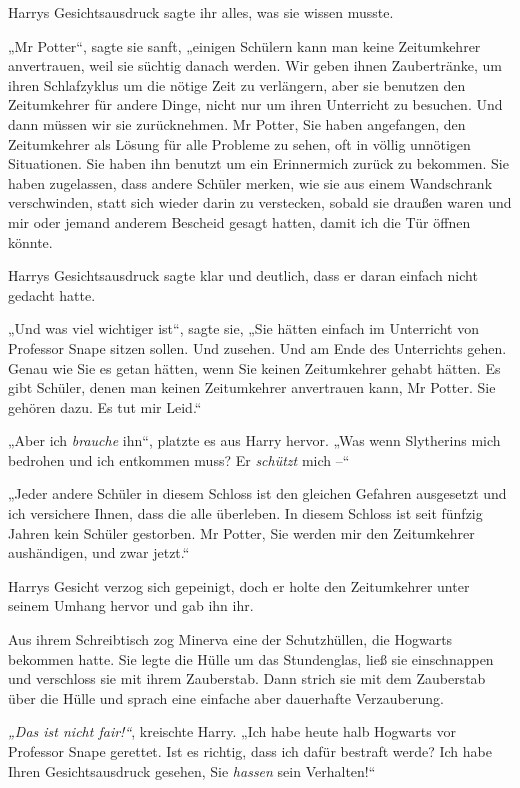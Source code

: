 {Harrys Gesichtsausdruck sagte ihr alles, was sie wissen musste.

„Mr Potter“, sagte sie sanft, „einigen Schülern kann man keine Zeitumkehrer anvertrauen, weil sie süchtig danach werden. Wir geben ihnen Zaubertränke, um ihren Schlafzyklus um die nötige Zeit zu verlängern, aber sie benutzen den Zeitumkehrer für andere Dinge, nicht nur um ihren Unterricht zu besuchen. Und dann müssen wir sie zurücknehmen. Mr Potter, Sie haben angefangen, den Zeitumkehrer als Lösung für alle Probleme zu sehen, oft in völlig unnötigen Situationen. Sie haben ihn benutzt um ein Erinnermich zurück zu bekommen. Sie haben zugelassen, dass andere Schüler merken, wie sie aus einem Wandschrank verschwinden, statt sich wieder darin zu verstecken, sobald sie draußen waren und mir oder jemand anderem Bescheid gesagt hatten, damit ich die Tür öffnen könnte.

Harrys Gesichtsausdruck sagte klar und deutlich, dass er daran einfach nicht gedacht hatte.

„Und was viel wichtiger ist“, sagte sie, „Sie hätten einfach im Unterricht von Professor Snape sitzen sollen. Und zusehen. Und am Ende des Unterrichts gehen. Genau wie Sie es getan hätten, wenn Sie keinen Zeitumkehrer gehabt hätten. Es gibt Schüler, denen man keinen Zeitumkehrer anvertrauen kann, Mr Potter. Sie gehören dazu. Es tut mir Leid.“

„Aber ich \emph{brauche} ihn“, platzte es aus Harry hervor. „Was wenn Slytherins mich bedrohen und ich entkommen muss? Er \emph{schützt} mich --“

„Jeder andere Schüler in diesem Schloss ist den gleichen Gefahren ausgesetzt und ich versichere Ihnen, dass die alle überleben. In diesem Schloss ist seit fünfzig Jahren kein Schüler gestorben. Mr Potter, Sie werden mir den Zeitumkehrer aushändigen, und zwar jetzt.“

Harrys Gesicht verzog sich gepeinigt, doch er holte den Zeitumkehrer unter seinem Umhang hervor und gab ihn ihr.

Aus ihrem Schreibtisch zog Minerva eine der Schutzhüllen, die Hogwarts bekommen hatte. Sie legte die Hülle um das Stundenglas, ließ sie einschnappen und verschloss sie mit ihrem Zauberstab. Dann strich sie mit dem Zauberstab über die Hülle und sprach eine einfache aber dauerhafte Verzauberung.

\emph{„Das ist nicht fair!“}, kreischte Harry. „Ich habe heute halb Hogwarts vor Professor Snape gerettet. Ist es richtig, dass ich dafür bestraft werde? Ich habe Ihren Gesichtsausdruck gesehen, Sie \emph{hassen} sein Verhalten!“

}
